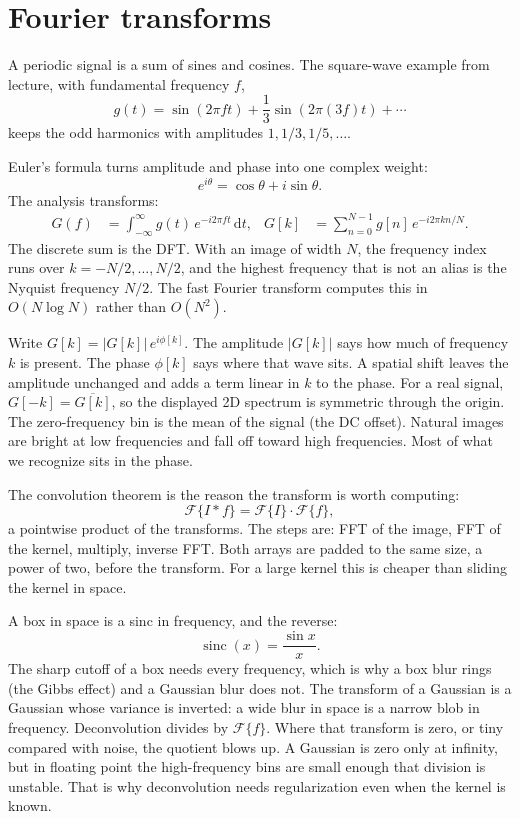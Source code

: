 \documentclass[11pt]{article}
\newcommand{\img}{I}
\newcommand{\filt}{f}
\newcommand{\conv}{\ast}
\begin{document}
\section{Fourier transforms}

A periodic signal is a sum of sines and cosines. The square-wave example from lecture, with fundamental frequency $f$,
\begin{equation}
g(t)=\sin(2\pi f t)+\frac13\sin(2\pi(3f)t)+\cdots
\end{equation}
keeps the odd harmonics with amplitudes $1,1/3,1/5,\ldots$.

Euler's formula turns amplitude and phase into one complex weight:
\begin{equation}
e^{i\theta}=\cos\theta+i\sin\theta.
\end{equation}
The analysis transforms:
\begin{align}
G(f)
&=
\int_{-\infty}^{\infty} g(t)\,e^{-i 2\pi f t}\,\mathrm{d}t,
&
G[k]
&=
\sum_{n=0}^{N-1} g[n]\,e^{-i 2\pi kn/N}.
\end{align}
The discrete sum is the DFT. With an image of width $N$, the frequency index runs over $k=-N/2,\ldots,N/2$, and the highest frequency that is not an alias is the Nyquist frequency $N/2$. The fast Fourier transform computes this in $O(N\log N)$ rather than $O(N^2)$.

Write $G[k]=|G[k]|\,e^{i\phi[k]}$. The amplitude $|G[k]|$ says how much of frequency $k$ is present. The phase $\phi[k]$ says where that wave sits. A spatial shift leaves the amplitude unchanged and adds a term linear in $k$ to the phase. For a real signal, $G[-k]=\overline{G[k]}$, so the displayed 2D spectrum is symmetric through the origin. The zero-frequency bin is the mean of the signal (the DC offset). Natural images are bright at low frequencies and fall off toward high frequencies. Most of what we recognize sits in the phase.

The convolution theorem is the reason the transform is worth computing:
\begin{equation}
\mathcal{F}\{\img\conv\filt\}
=
\mathcal{F}\{\img\}\cdot\mathcal{F}\{\filt\},
\end{equation}
a pointwise product of the transforms. The steps are: FFT of the image, FFT of the kernel, multiply, inverse FFT. Both arrays are padded to the same size, a power of two, before the transform. For a large kernel this is cheaper than sliding the kernel in space.

A box in space is a sinc in frequency, and the reverse:
\begin{equation}
\operatorname{sinc}(x)=\frac{\sin x}{x}.
\end{equation}
The sharp cutoff of a box needs every frequency, which is why a box blur rings (the Gibbs effect) and a Gaussian blur does not. The transform of a Gaussian is a Gaussian whose variance is inverted: a wide blur in space is a narrow blob in frequency. Deconvolution divides by $\mathcal{F}\{\filt\}$. Where that transform is zero, or tiny compared with noise, the quotient blows up. A Gaussian is zero only at infinity, but in floating point the high-frequency bins are small enough that division is unstable. That is why deconvolution needs regularization even when the kernel is known.
\end{document}
